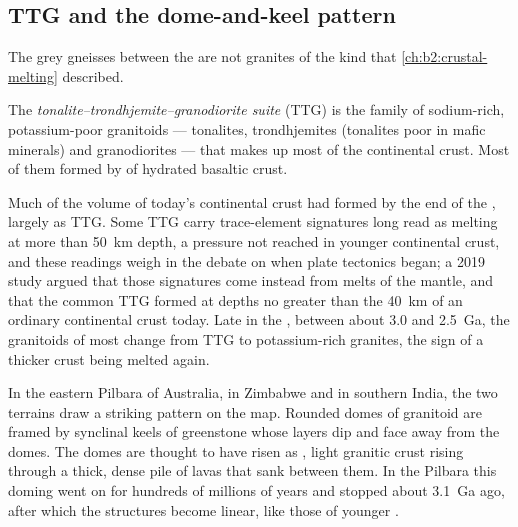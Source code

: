 \subsection*{TTG and the dome-and-keel pattern}

The grey gneisses between the  are not granites of the kind that
\cref{ch:b2:crustal-melting} described.

\begin{definition}\label{def:b2:precambrian-earth:ttg}
The \emph{tonalite--trondhjemite--granodiorite suite} (TTG) is the family of sodium-rich, potassium-poor granitoids --- tonalites,
trondhjemites (tonalites poor in mafic minerals) and granodiorites --- that makes up most of
the  continental crust. Most of them formed by  of hydrated basaltic
crust.
\end{definition}

Much of the volume of today's continental crust had formed by the end of the , largely
as TTG. Some TTG carry trace-element signatures long read as melting at more than
\qty{50}{km} depth, a pressure not reached in younger continental crust, and these readings
weigh in the debate on when plate tectonics began; a 2019 study argued that those signatures
come instead from melts of the mantle, and that the common TTG formed at
depths no greater than the \qty{40}{km} of an ordinary continental crust today. Late in the
, between about 3.0 and \qty{2.5}{Ga}, the granitoids of most  change from TTG
to potassium-rich granites, the sign of a thicker crust being melted again.

In the eastern Pilbara of Australia, in Zimbabwe and in southern India, the two terrains draw a
striking pattern on the map. Rounded domes of granitoid are framed by synclinal keels of greenstone whose layers dip and face away from the domes. The domes are
thought to have risen as , light granitic crust rising through a thick, dense pile of
lavas that sank between them. In the Pilbara this doming went on for hundreds of millions of
years and stopped about \qty{3.1}{Ga} ago, after which the structures become linear, like those
of younger .

